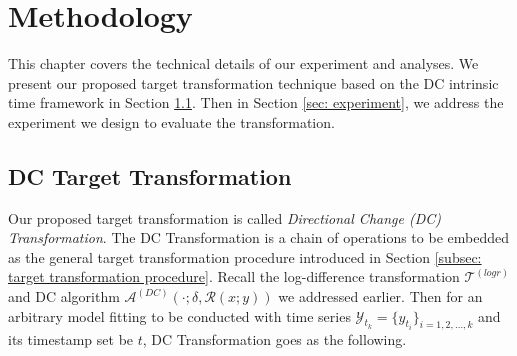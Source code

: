 \chapter{Methodology}\label{ch: methodology}
This chapter covers the technical details of our experiment and analyses. We present our proposed target transformation technique based on the DC intrinsic time framework in Section \ref{sec: dc transformation}. Then in Section \ref{sec: experiment}, we address the experiment we design to evaluate the transformation.

\section{DC Target Transformation}\label{sec: dc transformation}
Our proposed target transformation is called \textit{Directional Change (DC) Transformation}. The DC Transformation is a chain of operations to be embedded as the general target transformation procedure introduced in Section \ref{subsec: target transformation procedure}. Recall the log-difference transformation $\mathcal{T}^{(logr)}$ and DC algorithm $\mathcal{A}^{(DC)} (\cdot; \delta, \mathcal{R} (x; y))$ we addressed earlier. Then for an arbitrary model fitting to be conducted with time series $\mathcal{Y}_{t_k} = \{y_{t_i}\}_{i = 1, 2, \ldots, k}$ and its timestamp set be $t$, DC Transformation goes as the following.

